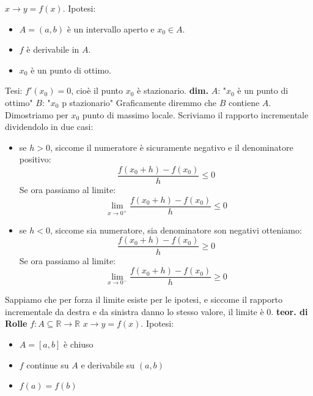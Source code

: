 $x \rightarrow  y = f(x)$.\newline
Ipotesi:
\begin{itemize}
    \item $A = (a,b)$ è un intervallo aperto e $x_0 \in A$.
    \item $f$ è derivabile in $A$.
    \item $x_0$ è un punto di ottimo.
\end{itemize} 
Tesi:\newline
$f'(x_0) = 0$, cioè il punto $x_0$ è stazionario.\newline
\textbf{dim.} \newline
\textbf{$A$}: "$x_0$ è un punto di ottimo"\newline
\textbf{$B$}: "$x_0$ p stazionario"\newline
Graficamente diremmo che $B$ contiene $A$.\newline
Dimostriamo per $x_0$ punto di massimo locale. Scriviamo il rapporto incrementale dividendolo in due casi:\newline
\begin{itemize}
    \item  se $h>0$, siccome il numeratore è sicuramente negativo e il denominatore positivo:
        \[
            \frac{f(x_0+h)-f(x_0)}{h} \leq 0
        \]
    Se ora passiamo al limite:
        \[
            \lim_{x\rightarrow 0^+} \frac{f(x_0+h)-f(x_0)}{h} \leq 0
        \]
    \item se $h<0$, siccome sia numeratore, sia denominatore son negativi otteniamo:
        \[
            \frac{f(x_0+h)- f(x_0)}{h} \geq 0
        \]
    Se ora passiamo al limite:
        \[
            \lim_{x\rightarrow 0^-} \frac{f(x_0+h)-f(x_0)}{h} \geq 0
        \]
\end{itemize}
Sappiamo che per forza il limite esiste per le ipotesi, e siccome il rapporto incrementale da destra e da sinistra danno lo stesso valore, il limite è $0$.\newline
\newline
\newline
\textbf{teor. di Rolle} \newline
$f: A \subseteq \mathbb{R} \rightarrow  \mathbb{R}$\newline
$x \rightarrow  y = f(x)$.\newline
Ipotesi:
\begin{itemize}
    \item $A = [a,b]$ è chiuso
    \item $f$ continue su $A$ e derivabile su $(a,b)$
    \item $f(a) = f(b)$
\end{itemize}
